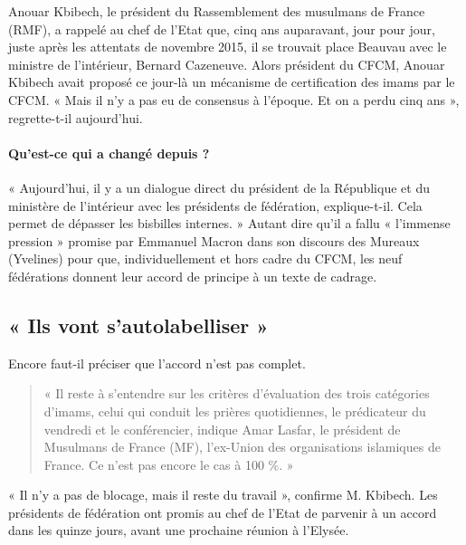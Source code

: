 Anouar Kbibech, le président du Rassemblement des musulmans de France (RMF), a rappelé au chef de l’Etat que, cinq ans auparavant, jour pour jour, juste après les attentats de novembre 2015, il se trouvait place Beauvau avec le ministre de l’intérieur, Bernard Cazeneuve. Alors président du CFCM, Anouar Kbibech avait proposé ce jour-là un mécanisme de certification des imams par le CFCM. « Mais il n’y a pas eu de consensus à l’époque. Et on a perdu cinq ans », regrette-t-il aujourd’hui.
\paragraph{Qu’est-ce qui a changé depuis ?} « Aujourd’hui, il y a un dialogue direct du président de la République et du ministère de l’intérieur avec les présidents de fédération, explique-t-il. Cela permet de dépasser les bisbilles internes. » Autant dire qu’il a fallu « l’immense pression » promise par Emmanuel Macron dans son discours des Mureaux (Yvelines) pour que, individuellement et hors cadre du CFCM, les neuf fédérations donnent leur accord de principe à un texte de cadrage.
\subsection*{« Ils vont s’autolabelliser »}
Encore faut-il préciser que l’accord n’est pas complet. 
\begin{quote}
    « Il reste à s’entendre sur les critères d’évaluation des trois catégories d’imams, celui qui conduit les prières quotidiennes, le prédicateur du vendredi et le conférencier, indique Amar Lasfar, le président de Musulmans de France (MF), l’ex-Union des organisations islamiques de France. Ce n’est pas encore le cas à 100 \%. » 
\end{quote}
 
« Il n’y a pas de blocage, mais il reste du travail », confirme M. Kbibech. Les présidents de fédération ont promis au chef de l’Etat de parvenir à un accord dans les quinze jours, avant une prochaine réunion à l’Elysée.
